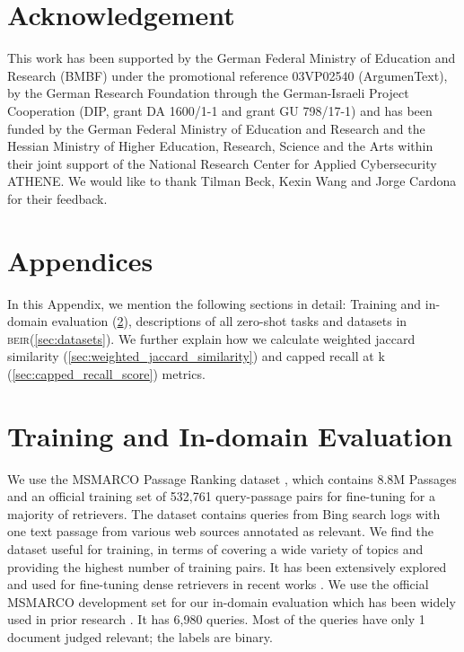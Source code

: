 \documentclass[11pt]{article}
\newcommand{\custo}[1]{\textsc{\normalsize #1}}
\newcommand{\beir}{\custo{beir}\xspace}
\begin{document}
\section*{Acknowledgement}
This work has been supported by the German Federal Ministry of Education and Research (BMBF) under the promotional reference 03VP02540 (ArgumenText), by the German Research Foundation through the German-Israeli Project Cooperation (DIP, grant DA 1600/1-1 and
grant GU 798/17-1) and has been funded by the German Federal Ministry of Education and Research and the Hessian Ministry of Higher Education, Research, Science and the Arts within their joint support of the National Research Center for Applied Cybersecurity ATHENE. We would like to thank Tilman Beck, Kexin Wang and Jorge Cardona for their feedback.








\appendix

\section{Appendices}

In this Appendix, we mention the following sections in detail: Training and in-domain evaluation (\ref{sec:training_dataset}), descriptions of all zero-shot tasks and datasets in \beir (\ref{sec:datasets}). We further explain how we calculate weighted jaccard similarity (\ref{sec:weighted_jaccard_similarity}) and capped recall at k (\ref{sec:capped_recall_score}) metrics. 


\section{Training and In-domain Evaluation}\label{sec:training_dataset}
We use the MSMARCO Passage Ranking dataset \cite{nguyen2016ms}, which contains 8.8M Passages and an official training set of 532,761 query-passage pairs for fine-tuning for a majority of retrievers. The dataset contains queries from Bing search logs with one text passage from various web sources annotated as relevant. We find the dataset useful for training, in terms of covering a wide variety of topics and providing the highest number of training pairs. It has been extensively explored and used for fine-tuning dense retrievers in recent works \cite{nogueira2020passage,gao2020complementing,ding2020rocketqa}. We use the official MSMARCO development set for our in-domain evaluation
which has been widely used in prior research \cite{nogueira2020passage, gao2020complementing,ding2020rocketqa}. It has 6,980 queries. Most of the queries have only 1 document judged relevant; the labels are binary.
\end{document}
